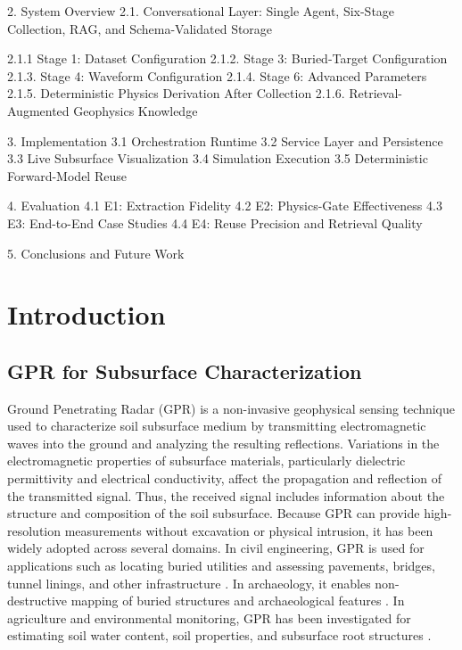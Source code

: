 \documentclass[journal]{IEEEtran}
\begin{document}
2. System Overview
   2.1. Conversational Layer: Single Agent, Six-Stage Collection, RAG, and Schema-Validated Storage

   2.1.1 Stage 1: Dataset Configuration
   2.1.2. Stage 3: Buried-Target Configuration
   2.1.3. Stage 4: Waveform Configuration
   2.1.4. Stage 6: Advanced Parameters
   2.1.5. Deterministic Physics Derivation After Collection
   2.1.6. Retrieval-Augmented Geophysics Knowledge

3. Implementation
   3.1 Orchestration Runtime
   3.2 Service Layer and Persistence
   3.3 Live Subsurface Visualization
   3.4 Simulation Execution
   3.5 Deterministic Forward-Model Reuse

4. Evaluation
   4.1 E1: Extraction Fidelity
   4.2 E2: Physics-Gate Effectiveness
   4.3 E3: End-to-End Case Studies
   4.4 E4: Reuse Precision and Retrieval Quality

5. Conclusions and Future Work




\section{Introduction}
\subsection{GPR for Subsurface Characterization}

Ground Penetrating Radar (GPR) is a non-invasive geophysical sensing technique used to characterize soil subsurface medium by transmitting electromagnetic waves into the ground and analyzing the resulting reflections. Variations in the electromagnetic properties of subsurface materials, particularly dielectric permittivity and electrical conductivity, affect the propagation and reflection of the transmitted signal. Thus, the received signal includes information about the structure and composition of the soil subsurface. Because GPR can provide high-resolution measurements without excavation or physical intrusion, it has been widely adopted across several domains. In civil engineering, GPR is used for applications such as locating buried utilities and assessing pavements, bridges, tunnel linings, and other infrastructure \cite{lai2018review}. In archaeology, it enables non-destructive mapping of buried structures and archaeological features \cite{leckebusch2003ground}. In agriculture and environmental monitoring, GPR has been investigated for estimating soil water content, soil properties, and subsurface root structures \cite{liu2016ground,huisman2003measuring}. 
\end{document}
